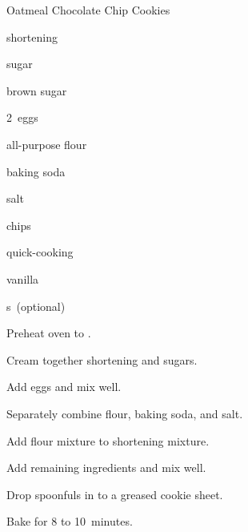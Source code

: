 \begin{recipe}{Oatmeal Chocolate Chip Cookies}{}{}

\begin{ingredients}
\item {} shortening
\item \C{\threequarter} sugar
\item \C{\threequarter} brown sugar
\item 2~eggs
\item \C{1\half} all-purpose flour
\item {} baking soda
\item {} salt
\item \C{2\half}  chips
\item {} quick-cooking 
\item {} vanilla
\item {} s~(optional)
\end{ingredients}

\begin{directions}
\item Preheat oven to .
\item Cream together shortening and sugars.
\item Add eggs and mix well.
\item Separately combine flour, baking soda, and salt.
\item Add flour mixture to shortening mixture.
\item Add remaining ingredients and mix well.
\item Drop spoonfuls in to a greased cookie sheet.
\item Bake for 8 to 10~minutes.
\end{directions}
\end{recipe}
